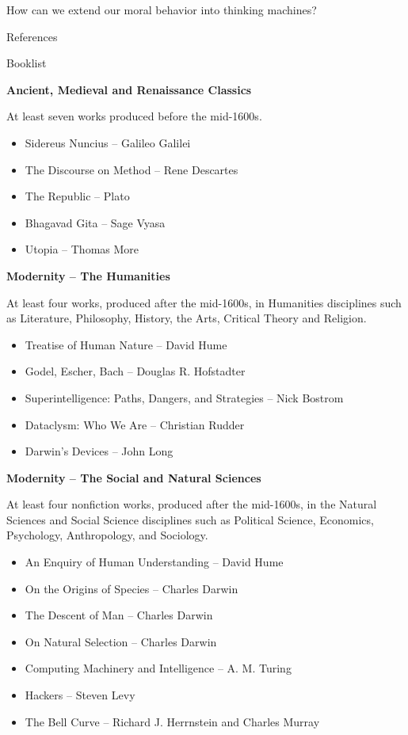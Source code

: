 \documentclass[11pt]{article}
\begin{document}
\par How can we extend our moral behavior into thinking machines?

\begin{center}
	{\large References\par}
\end{center}

\newpage

{\Large Booklist\\\par}

\par \textbf{Ancient, Medieval and Renaissance Classics}
\par At least seven works produced before the mid-1600s.
\begin{itemize}
	\item Sidereus Nuncius ­-- Galileo Galilei
	\item The Discourse on Method -- Rene Descartes
	\item The Republic -- Plato
	\item Bhagavad Gita -- Sage Vyasa
	\item Utopia -- Thomas More
\end{itemize}

\par \textbf{Modernity -- The Humanities}
\par At least four works, produced after the mid-1600s, in Humanities disciplines such as Literature, Philosophy, History, the Arts, Critical Theory and Religion.
\begin{itemize}
	\item Treatise of Human Nature -- David Hume
	\item Godel, Escher, Bach -- Douglas R. Hofstadter
	\item Superintelligence: Paths, Dangers, and Strategies -- Nick Bostrom
	\item Dataclysm: Who We Are -- Christian Rudder
	\item Darwin's Devices -- John Long
\end{itemize}

\par \textbf{Modernity -- The Social and Natural Sciences}
\par At least four nonfiction works, produced after the mid-1600s, in the Natural Sciences and Social Science disciplines such as Political Science, Economics, Psychology, Anthropology, and Sociology.
\begin{itemize}
	\item An Enquiry of Human Understanding -- David Hume
	\item On the Origins of Species -- Charles Darwin
	\item The Descent of Man -- Charles Darwin
	\item On Natural Selection -- Charles Darwin
	\item Computing Machinery and Intelligence -- A. M. Turing
	\item Hackers -- Steven Levy
	\item The Bell Curve -- Richard J. Herrnstein and Charles Murray
\end{itemize}
\end{document}
